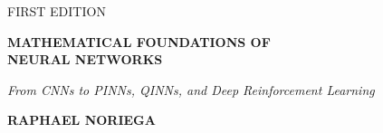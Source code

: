 \newcommand{\BookEdition}{FIRST EDITION}
\newcommand{\BookTitle}{MATHEMATICAL FOUNDATIONS OF\\ NEURAL NETWORKS}
\newcommand{\BookSubtitle}{From CNNs to PINNs, QINNs, and Deep Reinforcement Learning}
\newcommand{\BookAuthor}{RAPHAEL NORIEGA}


\begin{titlepage}
  \thispagestyle{empty}

  \AddToShipoutPictureBG*{%
    \AtPageLowerLeft{\color{coverbg}\rule{\paperwidth}{\paperheight}}%
  }

  \vspace*{1.6cm}
  \begin{center}
    {\Large\textsc{\textcolor{coverfg}{\BookEdition}}}
  \end{center}

  \vspace*{1.2cm}
  \begin{center}
    {\fontsize{34}{40}\selectfont\bfseries\textcolor{coverfg}{\BookTitle}\par}
    \vspace{0.8cm}
    {\large\itshape\textcolor{coverfg}{\BookSubtitle}\par}
  \end{center}

  \vfill
  \begin{center}
    {\fontsize{20}{24}\selectfont\bfseries\textcolor{coverfg}{\BookAuthor}\par}
  \end{center}
\end{titlepage}
\cleardoublepage